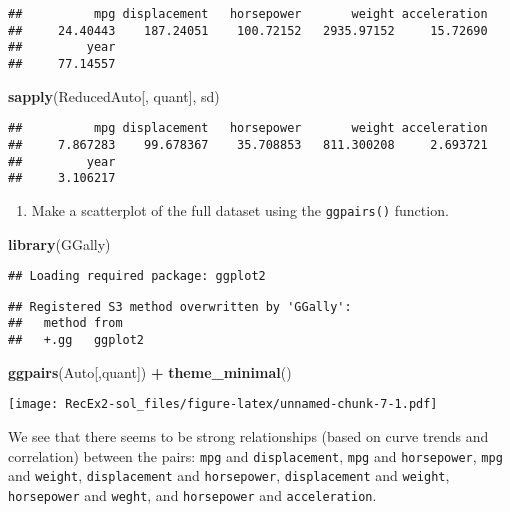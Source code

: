 \documentclass[]{article}
\newenvironment{Shaded}{\begin{snugshade}}{\end{snugshade}}
\newcommand{\KeywordTok}[1]{\textcolor[rgb]{0.13,0.29,0.53}{\textbf{#1}}}
\newcommand{\NormalTok}[1]{#1}
\newcommand{\OperatorTok}[1]{\textcolor[rgb]{0.81,0.36,0.00}{\textbf{#1}}}
\newcommand{\StringTok}[1]{\textcolor[rgb]{0.31,0.60,0.02}{#1}}
\providecommand{\tightlist}{%
  \setlength{\itemsep}{0pt}\setlength{\parskip}{0pt}}
\begin{document}
\begin{verbatim}
##          mpg displacement   horsepower       weight acceleration 
##     24.40443    187.24051    100.72152   2935.97152     15.72690 
##         year 
##     77.14557
\end{verbatim}

\begin{Shaded}
\begin{Highlighting}[]
\KeywordTok{sapply}\NormalTok{(ReducedAuto[, quant], sd)}
\end{Highlighting}
\end{Shaded}

\begin{verbatim}
##          mpg displacement   horsepower       weight acceleration 
##     7.867283    99.678367    35.708853   811.300208     2.693721 
##         year 
##     3.106217
\end{verbatim}

\begin{enumerate}
\def\labelenumi{\alph{enumi})}
\setcounter{enumi}{4}
\tightlist
\item
  Make a scatterplot of the full dataset using the \texttt{ggpairs()}
  function.
\end{enumerate}

\begin{Shaded}
\begin{Highlighting}[]
\KeywordTok{library}\NormalTok{(GGally)}
\end{Highlighting}
\end{Shaded}

\begin{verbatim}
## Loading required package: ggplot2
\end{verbatim}

\begin{verbatim}
## Registered S3 method overwritten by 'GGally':
##   method from   
##   +.gg   ggplot2
\end{verbatim}

\begin{Shaded}
\begin{Highlighting}[]
\KeywordTok{ggpairs}\NormalTok{(Auto[,quant]) }\OperatorTok{+}\StringTok{ }\KeywordTok{theme_minimal}\NormalTok{()}
\end{Highlighting}
\end{Shaded}

\texttt{[image: RecEx2-sol\_files/figure-latex/unnamed-chunk-7-1.pdf]}

We see that there seems to be strong relationships (based on curve
trends and correlation) between the pairs: \texttt{mpg} and
\texttt{displacement}, \texttt{mpg} and \texttt{horsepower},
\texttt{mpg} and \texttt{weight}, \texttt{displacement} and
\texttt{horsepower}, \texttt{displacement} and \texttt{weight},
\texttt{horsepower} and \texttt{weght}, and \texttt{horsepower} and
\texttt{acceleration}.
\end{document}
